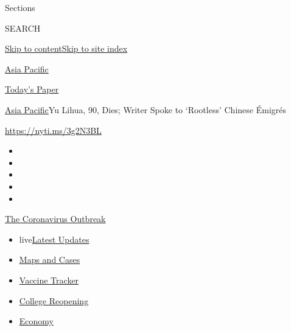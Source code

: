 Sections

SEARCH

\protect\hyperlink{site-content}{Skip to
content}\protect\hyperlink{site-index}{Skip to site index}

\href{https://www.nytimes3xbfgragh.onion/section/world/asia}{Asia
Pacific}

\href{https://myaccount.nytimes3xbfgragh.onion/auth/login?response_type=cookie\&client_id=vi}{}

\href{https://www.nytimes3xbfgragh.onion/section/todayspaper}{Today's
Paper}

\href{/section/world/asia}{Asia Pacific}\textbar{}Yu Lihua, 90, Dies;
Writer Spoke to `Rootless' Chinese Émigrés

\url{https://nyti.ms/3g2N3BL}

\begin{itemize}
\item
\item
\item
\item
\item
\end{itemize}

\href{https://www.nytimes3xbfgragh.onion/news-event/coronavirus?action=click\&pgtype=Article\&state=default\&region=TOP_BANNER\&context=storylines_menu}{The
Coronavirus Outbreak}

\begin{itemize}
\tightlist
\item
  live\href{https://www.nytimes3xbfgragh.onion/2020/08/04/world/coronavirus-covid-19.html?action=click\&pgtype=Article\&state=default\&region=TOP_BANNER\&context=storylines_menu}{Latest
  Updates}
\item
  \href{https://www.nytimes3xbfgragh.onion/interactive/2020/us/coronavirus-us-cases.html?action=click\&pgtype=Article\&state=default\&region=TOP_BANNER\&context=storylines_menu}{Maps
  and Cases}
\item
  \href{https://www.nytimes3xbfgragh.onion/interactive/2020/science/coronavirus-vaccine-tracker.html?action=click\&pgtype=Article\&state=default\&region=TOP_BANNER\&context=storylines_menu}{Vaccine
  Tracker}
\item
  \href{https://www.nytimes3xbfgragh.onion/2020/08/02/us/covid-college-reopening.html?action=click\&pgtype=Article\&state=default\&region=TOP_BANNER\&context=storylines_menu}{College
  Reopening}
\item
  \href{https://www.nytimes3xbfgragh.onion/live/2020/08/03/business/stock-market-today-coronavirus?action=click\&pgtype=Article\&state=default\&region=TOP_BANNER\&context=storylines_menu}{Economy}
\end{itemize}

